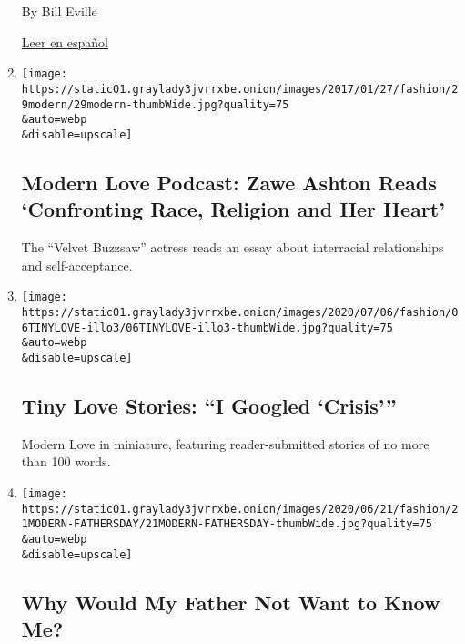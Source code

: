 \begin{enumerate}
  By Bill Eville

  \href{https://www.nytimes3xbfgragh.onion/es/2020/07/05/espanol/estilos-de-vida/cancer-cabello.html}{Leer
  en español}
\item
  \href{/2020/06/24/style/modern-love-podcast-zawe-ashton.html}{}

  \texttt{[image: https://static01.graylady3jvrrxbe.onion/images/2017/01/27/fashion/29modern/29modern-thumbWide.jpg?quality=75\\\&auto=webp\\\&disable=upscale]}

  \hypertarget{modern-love-podcast-zawe-ashton-reads-confronting-race-religion-and-her-heart}{%
  \subsection{Modern Love Podcast: Zawe Ashton Reads `Confronting Race,
  Religion and Her
  Heart'}\label{modern-love-podcast-zawe-ashton-reads-confronting-race-religion-and-her-heart}}

  The ``Velvet Buzzsaw'' actress reads an essay about interracial
  relationships and self-acceptance.
\item
  \href{/2020/06/23/style/tiny-modern-love-stories-coronavirus-i-googled-crisis.html}{}

  \texttt{[image: https://static01.graylady3jvrrxbe.onion/images/2020/07/06/fashion/06TINYLOVE-illo3/06TINYLOVE-illo3-thumbWide.jpg?quality=75\\\&auto=webp\\\&disable=upscale]}

  \hypertarget{tiny-love-stories-i-googled-crisis}{%
  \subsection{Tiny Love Stories: ``I Googled
  `Crisis'''}\label{tiny-love-stories-i-googled-crisis}}

  Modern Love in miniature, featuring reader-submitted stories of no
  more than 100 words.
\item
  \href{/2020/06/19/style/modern-love-coronavirus-missing-father.html}{}

  \texttt{[image: https://static01.graylady3jvrrxbe.onion/images/2020/06/21/fashion/21MODERN-FATHERSDAY/21MODERN-FATHERSDAY-thumbWide.jpg?quality=75\\\&auto=webp\\\&disable=upscale]}

  \hypertarget{why-would-my-father-not-want-to-know-me}{%
  \subsection{Why Would My Father Not Want to Know
  Me?}\label{why-would-my-father-not-want-to-know-me}}


\end{enumerate}
